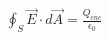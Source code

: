 \documentclass[preview]{standalone}
\begin{document}
\begin{align*}
\oint_S \vec{E} \cdot d\vec{A} = \frac{Q_{enc}}{\epsilon_0}
\end{align*}
\end{document}
